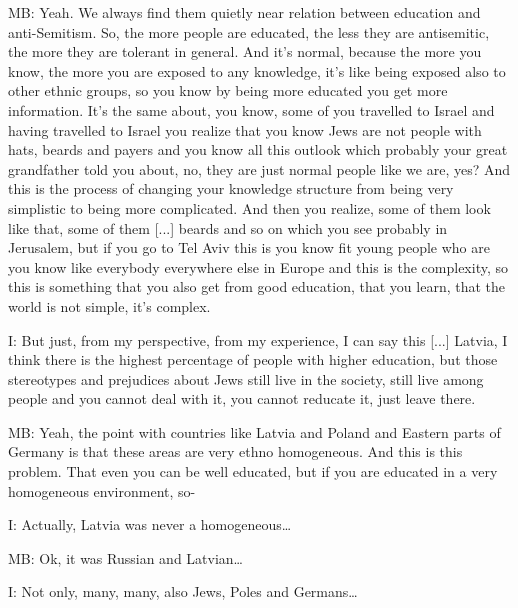 MB: Yeah. We always find them quietly near relation between education and anti-Semitism. So, the more people are educated, the less they are antisemitic, the more they are tolerant in general. And it’s normal, because the more you know, the more you are exposed to any knowledge, it’s like being exposed also to other ethnic groups, so you know by being more educated you get more information. It’s the same about, you know, some of you travelled to Israel and having travelled to Israel you realize that you know Jews are not people with hats, beards and payers and you know all this outlook which probably your great grandfather told you about, no, they are just normal people like we are, yes? And this is the process of changing your knowledge structure from being very simplistic to being more complicated. And then you realize, some of them look like that, some of them [...] beards and so on which you see probably in Jerusalem, but if you go to Tel Aviv this is you know fit young people who are you know like everybody everywhere else in Europe and this is the complexity, so this is something that you also get from good education, that you learn, that the world is not simple, it’s complex. 

I: But just, from my perspective, from my experience, I can say this [...] Latvia, I think there is the highest percentage of people with higher education, but those stereotypes and prejudices about Jews still live in the society, still live among people and you cannot deal with it, you cannot reducate it, just leave there. 

MB: Yeah, the point with countries like Latvia and Poland and Eastern parts of Germany is that these areas are very ethno homogeneous. And this is this problem. That even you can be well educated, but if you are educated in a very homogeneous environment, so- 

I: Actually, Latvia was never a homogeneous… 

MB: Ok, it was Russian and Latvian… 

I: Not only, many, many, also Jews, Poles and Germans… 

